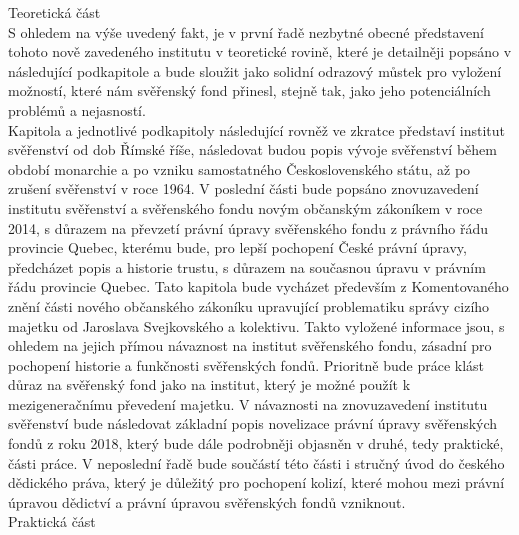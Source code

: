 \documentclass{article}
\begin{document}

\newpage

{\Large Teoretická část}\\

S ohledem na výše uvedený fakt, je v první řadě nezbytné obecné představení tohoto nově zavedeného institutu v teoretické rovině, které je detailněji popsáno v následující podkapitole a bude sloužit jako solidní odrazový můstek pro vylož\-ení možností, které nám svěřenský fond přinesl, stejně tak, jako jeho potenciálních problémů a nejasností. \\

Kapitola a jednotlivé podkapitoly následující rovněž ve zkratce představí institut svěřenství od dob Římské říše, následovat budou popis vývoje svěřenství během období monarchie a po vzniku samostatného Československého státu, až po zrušení svěřenství v roce 1964. V poslední části bude popsáno znovuzavedení institutu svěřenství a svěřenského fondu novým občanským zá\-koníkem v roce 2014, s důrazem na převzetí právní úpravy svěřenského fondu z právního řádu provincie Quebec, kterému bude, pro lepší pochopení České právní úpravy, předcházet popis a historie trustu, s důrazem na současnou úpravu v právním řádu provincie Quebec. Tato kapitola bude vycházet především z Komentovaného znění části nového občanského zákoníku upravující problematiku správy cizího majetku od Jaroslava Svejkovského a kolektivu. Takto vyložené informace jsou, s ohledem na jejich přímou návaznost na institut svěřenského fondu, zásadní pro pochopení historie a funkčnosti svěřenských fondů. Prioritně bude práce klást důraz na svěřenský fond jako na institut, který je možné použít k mezigeneračnímu převedení majetku. V návaznosti na znovuzavedení institutu svěřenství bude následovat základní popis novelizace právní úpravy svěřenských fondů z roku 2018, který bude dále podrobněji objasněn v druhé, tedy praktické, části práce. V neposlední řadě bude součástí této části i stručný úvod do českého dědického práva, který je důležitý pro pochopení kolizí, které mohou mezi právní úpravou dědictví a právní úpravou svěřenských fondů vzniknout.\\


{\Large Praktická část}\\
\end{document}
